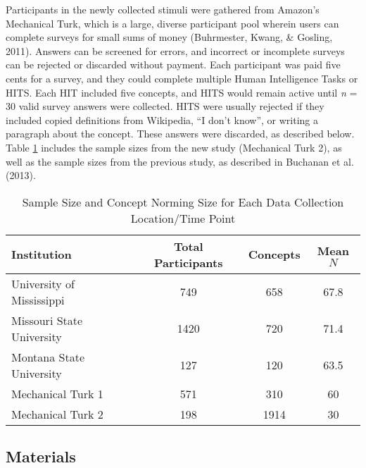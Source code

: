\documentclass[english,man]{apa6}
\theoremstyle{definition}
\theoremstyle{definition}
\theoremstyle{definition}
\theoremstyle{remark}
\begin{document}
Participants in the newly collected stimuli were gathered from Amazon's
Mechanical Turk, which is a large, diverse participant pool wherein
users can complete surveys for small sums of money (Buhrmester, Kwang,
\& Gosling, 2011). Answers can be screened for errors, and incorrect or
incomplete surveys can be rejected or discarded without payment. Each
participant was paid five cents for a survey, and they could complete
multiple Human Intelligence Tasks or HITS. Each HIT included five
concepts, and HITS would remain active until \emph{n} = 30 valid survey
answers were collected. HITS were usually rejected if they included
copied definitions from Wikipedia, \enquote{I don't know}, or writing a
paragraph about the concept. These answers were discarded, as described
below. Table \ref{tab:part-table} includes the sample sizes from the new
study (Mechanical Turk 2), as well as the sample sizes from the previous
study, as described in Buchanan et al. (2013).

\begin{table}[tbp]
\begin{center}
\begin{threeparttable}
\caption{\label{tab:part-table}Sample Size and Concept Norming Size for Each Data Collection Location/Time Point}
\begin{tabular}{lccc}
\toprule
Institution & Total Participants & Concepts & Mean $N$\\
\midrule
University of Mississippi & 749 & 658 & 67.8\\
Missouri State University & 1420 & 720 & 71.4\\
Montana State University & 127 & 120 & 63.5\\
Mechanical Turk 1 & 571 & 310 & 60\\
Mechanical Turk 2 & 198 & 1914 & 30\\
\bottomrule
\end{tabular}
\end{threeparttable}
\end{center}
\end{table}

\subsection{Materials}\label{materials}
\end{document}
